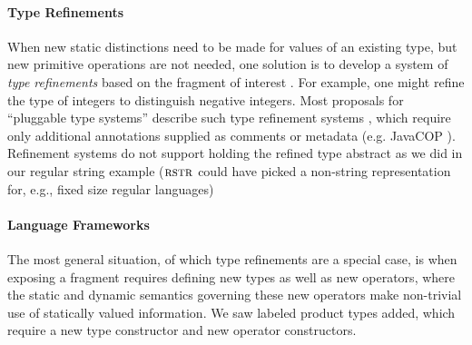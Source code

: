 \documentclass[10pt,preprint]{sigplanconf}
\begin{document}
\paragraph{Type Refinements}
When new static distinctions need to be made for values of an existing type, but new primitive operations are not needed, one solution is to develop a system of \emph{type refinements} based on the fragment of interest \cite{Freeman91}. For example, one might refine the type of integers to distinguish negative integers. Most proposals for ``pluggable type systems'' describe such type refinement systems \cite{Brac04a}, which require only additional annotations supplied as comments or metadata (e.g. JavaCOP \cite{Andreae:2006:FIP:1167473.1167479}). Refinement systems do not support holding the refined type abstract as we did in our regular string example ($\textsc{rstr}$ could have picked a non-string representation for, e.g., fixed size regular languages)%

\paragraph{Language Frameworks}
The most general situation, of which type refinements are a special case, is when exposing a fragment requires defining new types as well as new operators, where the static and dynamic semantics governing these new operators make non-trivial use of  statically valued information. 
We saw labeled product types added, which require a new type constructor and new operator constructors.%
\end{document}

